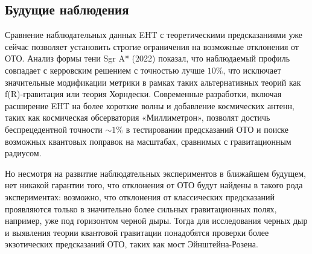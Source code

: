 \subsection{Будущие наблюдения}\label{sub:1.3.4}

Сравнение наблюдательных данных EHT с теоретическими предсказаниями уже сейчас позволяет установить строгие ограничения на возможные отклонения от ОТО. Анализ формы тени Sgr A* (2022) показал, что наблюдаемый профиль совпадает с керровским решением с точностью лучше \(10\%\), что исключает значительные модификации метрики в рамках таких альтернативных теорий как f(R)-гравитация или теория Хорндески. Современные разработки, включая расширение EHT на более короткие волны и добавление космических антенн, таких как космическая обсерватория «Миллиметрон», позволят достичь беспрецедентной точности \(\sim 1\%\) в тестировании предсказаний ОТО и поиске возможных квантовых поправок на масштабах, сравнимых с гравитационным радиусом.

Но несмотря на развитие наблюдательных экспериментов в ближайшем будущем, нет никакой гарантии того, что отклонения от ОТО будут найдены в такого рода экспериментах: возможно, что отклонения от классических предсказаний проявляются только в значительно более сильных гравитационных полях, например, уже под горизонтом черной дыры. Тогда для исследования черных дыр и выявления теории квантовой гравитации понадобятся проверки более экзотических предсказаний ОТО, таких как мост Эйнштейна-Розена.





